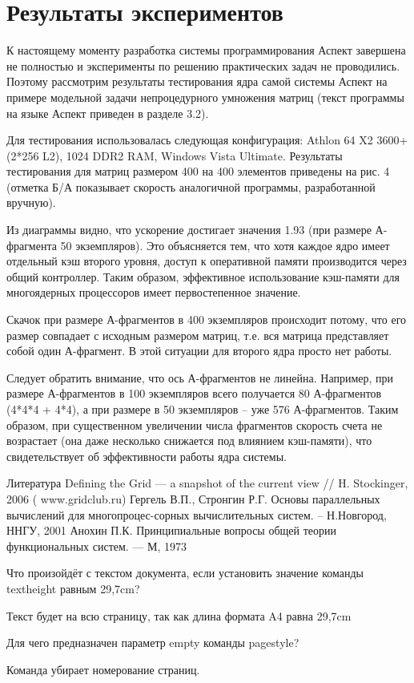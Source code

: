 \documentclass[11pt]{article}
\begin{document}
\section{Результаты экспериментов}
К настоящему моменту разработка системы программирования Аспект завершена не полностью и эксперименты по решению практических задач не проводились. Поэтому рассмотрим результаты тестирования ядра самой системы Аспект на примере модельной задачи непроцедурного умножения матриц (текст программы на языке Аспект приведен в разделе 3.2).\par
Для тестирования использовалась следующая конфигурация: Athlon 64 X2 3600+ (2*256 L2), 1024 DDR2 RAM, Windows Vista Ultimate. Результаты тестирования для матриц размером 400 на 400 элементов приведены на рис. 4 (отметка Б/А показывает скорость аналогичной программы, разработанной вручную).\par
Из диаграммы видно, что ускорение достигает значения 1.93 (при размере А-фрагмента 50 экземпляров). Это объясняется тем, что хотя каждое ядро имеет отдельный кэш второго уровня, доступ к оперативной памяти производится через общий контроллер. Таким образом, эффективное использование кэш-памяти для многоядерных процессоров имеет первостепенное значение.\par
Скачок при размере А-фрагментов в 400 экземпляров происходит потому, что его размер совпадает с исходным размером матриц, т.е. вся матрица представляет собой один А-фрагмент. В этой ситуации для второго ядра просто нет работы.\par
Следует обратить внимание, что ось А-фрагментов не линейна. Например, при размере 
А-фрагментов в 100 экземпляров всего получается 80 А-фрагментов (4*4*4 + 4*4), а при размере в 50 экземпляров – уже 576 А-фрагментов. Таким образом, при существенном увеличении числа фрагментов скорость счета не возрастает (она даже несколько снижается под влиянием кэш-памяти), что свидетельствует об эффективности работы ядра системы.\par


\begin{thebibliography}{Литература}
Defining the Grid — a snapshot of the current view // H. Stockinger, 2006 ( www.gridclub.ru)
Гергель В.П., Стронгин Р.Г. Основы параллельных вычислений для многопроцес-сорных вычислительных систем. – Н.Новгород, ННГУ, 2001
Анохин П.К. Принципиальные вопросы общей теории функциональных систем. — М, 1973
\end{thebibliography}
Что произойдёт с текстом документа, если установить значение команды textheight  равным 29,7cm?

Текст будет на всю страницу, так как длина формата A4 равна 29,7cm

Для чего предназначен параметр empty команды pagestyle?

Команда убирает номерование страниц.
\end{document}
